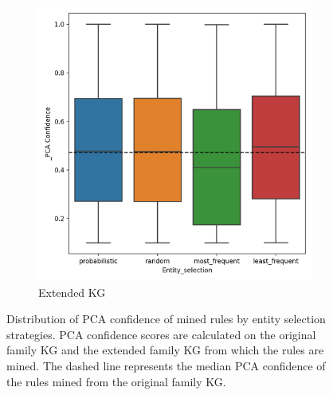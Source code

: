 \begin{figure}[htbp]
\begin{subfigure}{.5\textwidth}
  \includegraphics[width=1\linewidth]{figures/results/entity_selection/_PCA-entity_family.png}
  \caption{Extended KG}
  \label{fig:_PCA_entity_family_boxplot_sub}
\end{subfigure}
\caption[Dist. of PCA conf. of rules by entity selection strategies - family KG.]{Distribution of PCA confidence of mined rules by entity selection strategies. PCA confidence scores are calculated on the original family KG and the extended family KG from which the rules are mined. The dashed line represents the median PCA confidence of the rules mined from the original family KG.}
\label{fig:PCA_entity_family_boxplot}
\end{figure}

